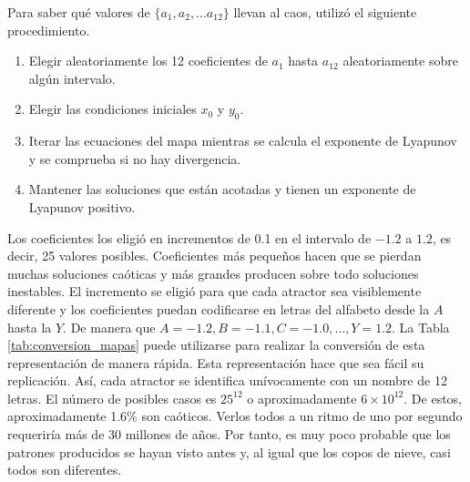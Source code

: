         Para saber qué valores de $\{a_{1}, a_{2}, \ldots a_{12}\}$ llevan al caos, \cite{Sprott1993} utilizó el siguiente procedimiento.

        \begin{enumerate}
            \item Elegir aleatoriamente los 12 coeficientes de $a_{1}$ hasta $a_{12}$ aleatoriamente sobre algún intervalo.
            \item Elegir las condiciones iniciales $x_{0}$ y $y_{0}$.
            \item Iterar las ecuaciones del mapa mientras se calcula el exponente de Lyapunov y se comprueba si no hay divergencia.
            \item Mantener las soluciones que están acotadas y tienen un exponente de Lyapunov positivo.
        \end{enumerate}

        Los coeficientes los eligió en incrementos de 0.1 en el intervalo de $-1.2$ a $1.2$, es decir, 25 valores posibles. Coeficientes más pequeños hacen que se pierdan muchas soluciones caóticas y más grandes producen sobre todo soluciones inestables. El incremento se eligió para que cada atractor sea visiblemente diferente y los coeficientes puedan codificarse en letras del alfabeto desde la $A$ hasta la $Y$. De manera que $A = -1.2, B = -1.1, C = -1.0, \ldots, Y = 1.2$. La Tabla \ref{tab:conversion_mapas} puede utilizarse para realizar la conversión de esta representación de manera rápida. Esta representación hace que sea fácil su replicación. Así, cada atractor se identifica unívocamente con un nombre de 12 letras. El número de posibles casos es $25^{12}$ o aproximadamente $6\times 10^{12}$. De estos, aproximadamente 1.6\% son caóticos. Verlos todos a un ritmo de uno por segundo requeriría más de 30 millones de años. Por tanto, es muy poco probable que los patrones producidos se hayan visto antes y, al igual que los copos de nieve, casi todos son diferentes.

